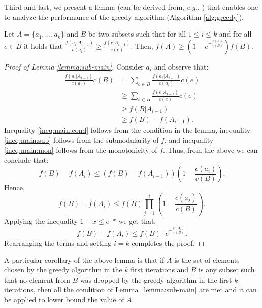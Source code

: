 Third and last, we present a lemma (can be derived from, {\em e.g.}, \cite{khuller1999budgeted}) that enables one to analyze the performance of the greedy algorithm (Algorithm \ref{alg:greedy}).
\begin{lemma}
\label{lemma:sub-main}
Let $A = \{a_1, \dots, a_k\}$ and $B$ be two subsets such that for all $1 \leq i \leq k$
and for all $e \in B$ it holds that
$\frac{f(a_i|A_{i-1})}{c(a_i)} \geq \frac{f(e|A_{i-1})}{c(e)}$.
Then, $f(A) \geq (1 - e^{-\frac{c(A)}{c(B)}})f(B)$.
\end{lemma}

\begin{proof}[Proof of Lemma \ref{lemma:sub-main}]
	Consider $a_i$ and observe that:
	\begin{align}
	\frac{f(a_i|A_{i-1})}{c(a_i)}c(B)
	& = \sum_{e \in B} \frac{f(a_i|A_{i-1})}{c(a_i)}c(e)
	\nonumber
	\\ 	& \geq \sum_{e \in B} \frac{f(e|A_{i-1})}{c(e)}c(e)
	\label{ineq:main:cond}
	\\	& \geq f(B|A_{i-1})
	\label{ineq:main:sub}
	\\ 	& \geq f(B) - f(A_{i-1}).
	\label{ineq:main:mon}
	\end{align}
	Inequality \eqref{ineq:main:cond} follows from the condition in the lemma, inequality \eqref{ineq:main:sub} follows from the submodularity of $f$, and inequality \eqref{ineq:main:mon} follows from the monotonicity of $f$.
	Thus, from the above we can conclude that:
	$$
	f(B) - f(A_i)  \leq (f(B) - f(A_{i - 1}))
	\left(1 - \frac{c(a_i)}{c(B)}\right).
	$$
	Hence,
	$$
	f(B) - f(A_i)  \leq f(B) \prod_{j = 1}^{i}
	\left(1 - \frac{c(a_j)}{c(B)}\right).
	$$
	Applying the inequality $1 - x \leq e^{-x}$ we get that:
	$$
	f(B) - f(A_i)  \leq f(B)\cdot
	e^{-\frac{c(A_i)}{c(B)}}.
	$$
	Rearranging the terms and setting $i = k$ completes the proof.
\end{proof}


A particular corollary of the above lemma is that if $A$ is the set of elements chosen by the greedy algorithm in
the $k$ first iterations and $B$ is any subset such that no element from $B$ was dropped by the greedy algorithm in the first $k$ iterations,
then all the condition of Lemma~\ref{lemma:sub-main} are met and it can be applied to lower bound the value of $A$.


%

